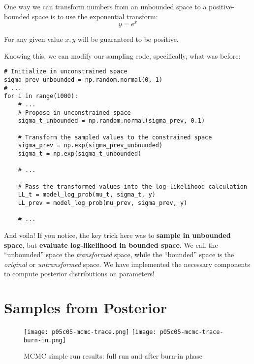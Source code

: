 One way we can transform numbers from an unbounded space to a positive-bounded space is to use the exponential transform:
\begin{equation}
y=e^x
\end{equation}

For any given value $x,y$ will be guaranteed to be positive.

Knowing this, we can modify our sampling code, specifically, what was before:

\begin{lstlisting}
# Initialize in unconstrained space
sigma_prev_unbounded = np.random.normal(0, 1)
# ...
for i in range(1000):
    # ...
    # Propose in unconstrained space
    sigma_t_unbounded = np.random.normal(sigma_prev, 0.1)

    # Transform the sampled values to the constrained space
    sigma_prev = np.exp(sigma_prev_unbounded)
    sigma_t = np.exp(sigma_t_unbounded)

    # ...

    # Pass the transformed values into the log-likelihood calculation
    LL_t = model_log_prob(mu_t, sigma_t, y)
    LL_prev = model_log_prob(mu_prev, sigma_prev, y)

    # ...
\end{lstlisting}

And voila! If you notice, the key trick here was to \textbf{sample in unbounded space}, but \textbf{evaluate log-likelihood in bounded space}. We call the ``unbounded'' space the \emph{transformed} space, while the ``bounded'' space is the \emph{original} or \emph{untransformed} space. We have implemented the necessary components to compute posterior distributions on parameters!

\section{Samples from Posterior}

\begin{figure*}[th]
\texttt{[image: p05c05-mcmc-trace.png]}
\texttt{[image: p05c05-mcmc-trace-burn-in.png]}
\caption{MCMC simple run results: full run and after burn-in phase}
\label{fig:p05c05-mcmc-trace}
\end{figure*}


